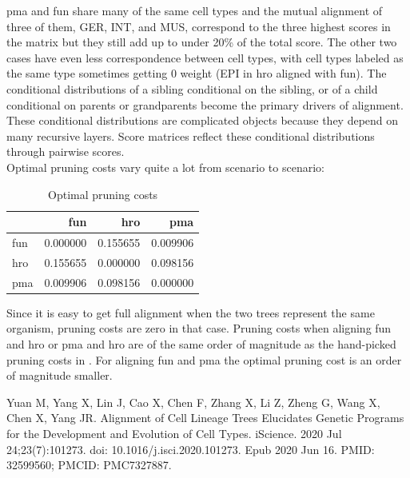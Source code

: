 \documentclass[12pt]{article}
\begin{document}
pma and fun share many of the same cell types and the mutual alignment of three of them, GER, INT, and MUS, correspond to the three highest scores in the matrix but they still add up to under 20\% of the total score. The other two cases have even less correspondence between cell types, with cell types labeled as the same type sometimes getting 0 weight (EPI in hro aligned with fun). The conditional distributions of a sibling conditional on the sibling, or of a child conditional on parents or grandparents become the primary drivers of alignment. These conditional distributions are complicated objects because they depend on many recursive layers. Score matrices reflect these conditional distributions through pairwise scores.\\
Optimal pruning costs vary quite a lot from scenario to scenario:\\
\begin{table}
  \center
\begin{tabular}{lrrr}
\toprule
 & fun & hro & pma \\
\midrule
fun & {\cellcolor[HTML]{FFFFE5}} \color[HTML]{000000} 0.000000 & {\cellcolor[HTML]{004529}} \color[HTML]{F1F1F1} 0.155655 & {\cellcolor[HTML]{FBFDCF}} \color[HTML]{000000} 0.009906 \\
hro & {\cellcolor[HTML]{004529}} \color[HTML]{F1F1F1} 0.155655 & {\cellcolor[HTML]{FFFFE5}} \color[HTML]{000000} 0.000000 & {\cellcolor[HTML]{3FA95C}} \color[HTML]{F1F1F1} 0.098156 \\
pma & {\cellcolor[HTML]{FBFDCF}} \color[HTML]{000000} 0.009906 & {\cellcolor[HTML]{3FA95C}} \color[HTML]{F1F1F1} 0.098156 & {\cellcolor[HTML]{FFFFE5}} \color[HTML]{000000} 0.000000 \\
\bottomrule
\end{tabular}
\caption{Optimal pruning costs}
\end{table}
Since it is easy to get full alignment when the two trees represent the same organism, pruning costs are zero in that case. Pruning costs when aligning fun and hro or pma and hro are of the same order of magnitude as the hand-picked pruning costs in \cite{CLT}. For aligning fun and pma the optimal pruning cost is an order of magnitude smaller.

\begin{thebibliography}{1}

  Yuan M, Yang X, Lin J, Cao X, Chen F, Zhang X, Li Z, Zheng G, Wang X, Chen X, Yang JR. Alignment of Cell Lineage Trees Elucidates Genetic Programs for the Development and Evolution of Cell Types. iScience. 2020 Jul 24;23(7):101273. doi: 10.1016/j.isci.2020.101273. Epub 2020 Jun 16. PMID: 32599560; PMCID: PMC7327887.

\end{thebibliography}
\end{document}
